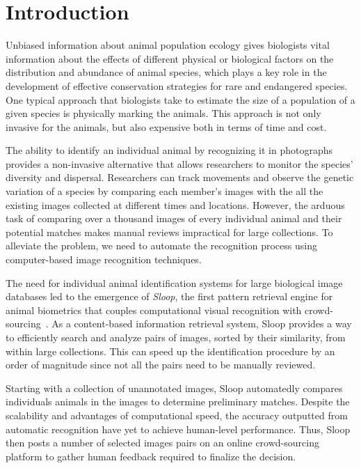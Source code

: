 \chapter{Introduction} %
\label{cha:introduction}

Unbiased information about animal population ecology gives biologists vital
information about the effects of different physical or biological factors on the
distribution and abundance of animal species, which plays a key role in the
development of effective conservation strategies for rare and endangered
species. One typical approach that biologists take to estimate the size of a
population of a given species is physically marking the animals.  This approach
is not only invasive for the animals, but also expensive both in terms of time
and cost.

The ability to identify an individual animal by recognizing it in photographs
provides a non-invasive alternative that allows researchers to monitor the
species' diversity and dispersal.  Researchers can track movements and observe
the genetic variation of a species by comparing each member's images with the
all the existing images collected at different times and locations. However, the
arduous task of comparing over a thousand images of every individual animal and
their potential matches makes manual reviews impractical for large collections.
To alleviate the problem, we need to automate the recognition process using
computer-based image recognition techniques.

The need for individual animal identification systems for large biological image
databases led to the emergence of \emph{Sloop}, the first pattern retrieval
engine for animal biometrics that couples computational visual recognition with
crowd-sourcing~\cite{sloop13,sloop14,sloop15}. As a content-based information
retrieval system, Sloop provides a way to efficiently search and analyze pairs
of images, sorted by their similarity, from within large collections. This can
speed up the identification procedure by an order of magnitude since not all the
pairs need to be manually reviewed.

Starting with a collection of unannotated images, Sloop automatedly compares
individuals animals in the images to determine preliminary matches. Despite the
scalability and advantages of computational speed, the accuracy outputted from
automatic recognition have yet to achieve human-level performance.  Thus, Sloop
then posts a number of selected images pairs on an online crowd-sourcing
platform to gather human feedback required to finalize the decision.

